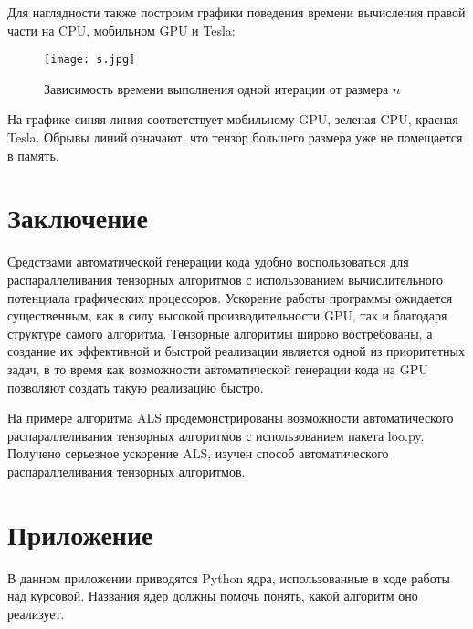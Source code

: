 \documentclass{scrartcl}
\begin{document}
Для наглядности также построим графики поведения времени вычисления правой части
на CPU, мобильном GPU и Tesla:

\begin{center}
\begin{figure}[H]
\centering
\texttt{[image: s.jpg]}
\caption{Зависимость времени выполнения одной итерации от размера $n$}
\end{figure}
\end{center}

На графике синяя линия соответствует мобильному GPU, зеленая CPU, красная Tesla. 
Обрывы линий означают, что тензор большего размера уже не помещается в память.
\section{Заключение}
\label{sec-11}

Средствами автоматической генерации кода удобно воспользоваться для распараллеливания
тензорных алгоритмов с использованием вычислительного потенциала графических процессоров.
Ускорение работы программы ожидается существенным, как в силу высокой производительности GPU,
так и благодаря структуре самого алгоритма. Тензорные алгоритмы широко востребованы,
а создание их эффективной и быстрой реализации является одной из приоритетных задач,
в то время как возможности автоматической генерации кода на GPU позволяют создать такую 
реализацию быстро.

На примере алгоритма ALS продемонстрированы возможности автоматического 
распараллеливания тензорных алгоритмов с использованием пакета loo.py. 
Получено серьезное ускорение ALS, изучен способ автоматического распараллеливания
тензорных алгоритмов.
\section{Приложение}
\label{sec-12}

В данном приложении приводятся Python ядра, использованные в ходе работы
над курсовой. Названия ядер должны помочь понять, какой алгоритм оно реализует.
\end{document}
